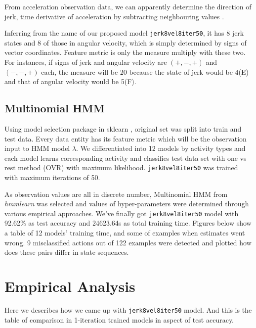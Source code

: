 \documentclass[10pt,twocolumn,letterpaper]{article}
\begin{document}
From acceleration observation data, we can apparently determine the direction of jerk, time derivative of acceleration by subtracting neighbouring values \cite{jerkwiki}.


Inferring from the name of our proposed model \texttt{jerk8vel8iter50}, it has 8 jerk states and 8 of those in angular velocity, which is simply determined by signs of vector coordinates. Feature metric is only the measure multiply with these two. For instances, if signs of jerk and angular velocity are $(+,-,+)$ and $(-,-,+)$ each, the measure will be 20 because the state of jerk would be 4(E) and that of angular velocity would be 5(F).

\subsection{Multinomial HMM}
Using model selection package in sklearn \cite{sklearn}, original set was split into train and test data. Every data entity has its feature metric which will be the observation input to HMM model $\lambda$. We differentiated into 12 models by activity types and each model learns corresponding activity and classifies test data set with one vs rest method (OVR) with maximum likelihood. \texttt{jerk8vel8iter50} was trained with maximum iterations of 50.

As observation values are all in discrete number, Multinomial HMM from \textit{hmmlearn} was selected and values of hyper-parameters were determined through various empirical approaches. We've finally got \texttt{jerk8vel8iter50} model with 92.62\% as test accuracy and 24623.64s as total training time. Figures below show a table of 12 models' training time, and some of examples when estimates went wrong. 9 misclassified actions out of 122 examples were detected and plotted how does these pairs differ in state sequences.

\section{Empirical Analysis}

Here we describes how we came up with \texttt{jerk8vel8iter50} model. And this is the table of comparison in 1-iteration trained models in aspect of test accuracy.
\end{document}
